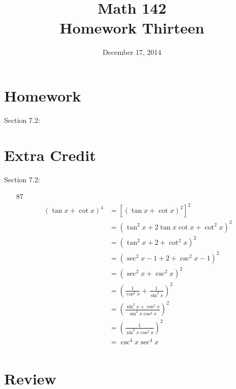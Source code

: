 \documentclass{exam}
\author{}
\date{December 17, 2014}
\title{Math 142 \\ Homework Thirteen}
\begin{document}
  \maketitle

  \section{Homework}
  Section 7.2: 

  \section{Extra Credit}
  Section 7.2: 

  \ifprintanswers
    \pagebreak
    \begin{enumerate}

      \item[87] 
        \begin{align*}
          (\tan x + \cot x)^4 & = \left[ (\tan x + \cot x)^2 \right]^2 \\
                              & = \left( \tan^2 x + 2 \tan x \cot x + \cot^2 x \right)^2 \\
                              & = \left( \tan^2 x + 2 + \cot^2 x \right)^2 \\
                              & = \left( \sec^2 x - 1 + 2 + \csc^2 x - 1 \right)^2 \\
                              & = \left( \sec^2 x + \csc^2 x \right)^2 \\
                              & = \left( \frac{1}{\cos^2 x} + \frac{1}{\sin^2 x} \right)^2 \\
                              & = \left( \frac{\sin^2 x + \cos^2 x}{\sin^2 x \cos^2 x} \right)^2 \\
                              & = \left( \frac{1}{\sin^2 x \cos^2 x} \right)^2 \\
                              & = \csc^4 x \sec^4 x \\
        \end{align*}

    \end{enumerate}
  \fi

  \section{Review}

  \ifprintanswers
\end{document}
